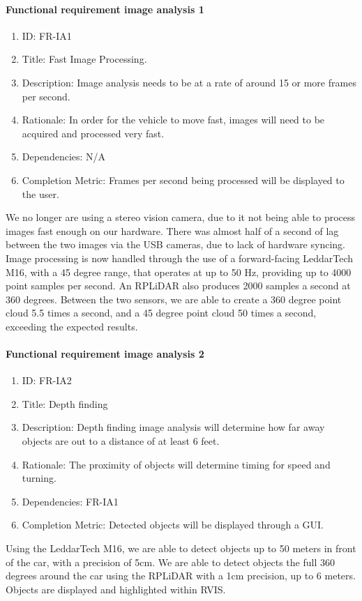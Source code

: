 \documentclass[compsoc,draftclsnofoot,onecolumn,10pt]{IEEEtran}
\begin{document}
	\paragraph{\textbf{Functional requirement image analysis 1}}
		\begin{enumerate}
			\item ID: FR-IA1
			\item Title: Fast Image Processing.
			\item Description: Image analysis needs to be at a rate of around 15 or more frames per second.
			\item Rationale: In order for the vehicle to move fast, images will need to be acquired and processed very fast.
			\item Dependencies: N/A
			\item Completion Metric: Frames per second being processed will be displayed to the user. 
		\end{enumerate}	
	We no longer are using a stereo vision camera, due to it not being able to process images fast enough on our hardware. There was almost half of a second of lag between the two images via the USB cameras, due to lack of hardware syncing. 
	Image processing is now handled through the use of a forward-facing LeddarTech M16, with a 45 degree range, that operates at up to 50 Hz, providing up to 4000 point samples per second.
    An RPLiDAR also produces 2000 samples a second at 360 degrees. 
    Between the two sensors, we are able to create a 360 degree point cloud 5.5 times a second, and a 45 degree point cloud 50 times a second, exceeding the expected results.

	\paragraph{\textbf{Functional requirement image analysis 2}}
		\begin{enumerate}
			\item ID: FR-IA2
			\item Title: Depth finding
			\item Description: Depth finding image analysis will determine how far away objects are out to a distance of at least 6 feet.
			\item Rationale: The proximity of objects will determine timing for speed and turning. 
			\item Dependencies: FR-IA1
			\item Completion Metric: Detected objects will be displayed through a GUI.
		\end{enumerate}
	Using the LeddarTech M16, we are able to detect objects up to 50 meters in front of the car, with a precision of 5cm. 
	We are able to detect objects the full 360 degrees around the car using the RPLiDAR with a 1cm precision, up to 6 meters. 
	Objects are displayed and highlighted within RVIS. 
	
\end{document}
